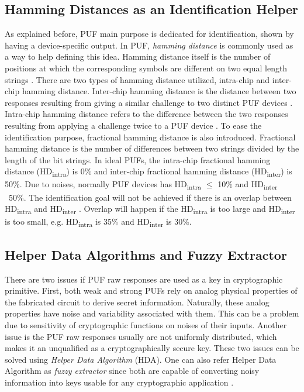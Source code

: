 \subsection{Hamming Distances as an Identification Helper}

As explained before, PUF main purpose is dedicated for identification, shown by having a device-specific output. In PUF, \textit{hamming distance} is commonly used as a way to help defining this idea. Hamming distance itself is the number of positions at which the corresponding symbols are different on two equal length strings \cite{hamming_distance}.
There are two types of hamming distance utilized, intra-chip and inter-chip hamming distance. Inter-chip hamming distance is the distance between two responses resulting from giving a similar challenge to two distinct PUF devices \cite{study_of_the_art_puf}. Intra-chip hamming distance refers to the difference between the two responses resulting from applying a challenge twice to a PUF device \cite{modeling_sram}. To ease the identification purpose, fractional hamming distance is also introduced. Fractional hamming distance is the number of differences between two strings divided by the length of the bit strings.
In ideal PUFs, the intra-chip fractional hamming distance (HD\textsubscript{intra}) is 0\% and inter-chip fractional hamming distance (HD\textsubscript{inter}) is 50\%. Due to noises, normally PUF devices has HD\textsubscript{intra} $\leq$ 10\% and HD\textsubscript{inter} ~50\%. The identification goal will not be achieved if there is an overlap between HD\textsubscript{intra} and HD\textsubscript{inter} \cite{impact_aging}. Overlap will happen if the HD\textsubscript{intra} is too large and HD\textsubscript{inter} is too small, e.g. HD\textsubscript{intra} is 35\% and HD\textsubscript{inter} is 30\%.

\subsection{Helper Data Algorithms and Fuzzy Extractor}

There are two issues if PUF raw responses are used as a key in cryptographic primitive. First, both weak and strong PUFs rely on analog physical properties of the fabricated circuit to derive secret information. Naturally, these analog properties have noise and variability associated with them.
This can be a problem due to sensitivity of cryptographic functions on noises of their inputs.
Another issue is the PUF raw responses usually are not uniformly distributed, which makes it an unqualified as a cryptographically secure key. These two issues can be solved using \textit{Helper Data Algorithm} (HDA). One can also refer Helper Data Algorithm as \textit{fuzzy extractor} since both are capable of converting noisy information into keys usable for any cryptographic application \cite{efficient_helper} \cite{fuzzy_extractor}.

